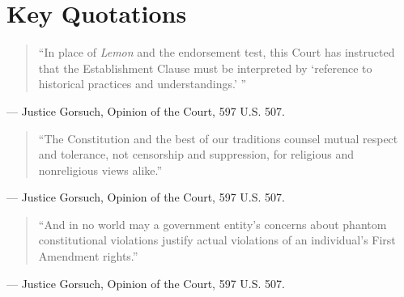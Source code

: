 \documentclass[12pt]{article}
\begin{document}
\section{Key Quotations}

\begin{quote}
``In place of \textit{Lemon} and the endorsement test, this Court has instructed that the Establishment Clause must be interpreted by `reference to historical practices and understandings.' ''
\end{quote}
\noindent --- Justice Gorsuch, Opinion of the Court, 597 U.S. 507.

\begin{quote}
``The Constitution and the best of our traditions counsel mutual respect and tolerance, not censorship and suppression, for religious and nonreligious views alike.''
\end{quote}
\noindent --- Justice Gorsuch, Opinion of the Court, 597 U.S. 507.

\begin{quote}
``And in no world may a government entity's concerns about phantom constitutional violations justify actual violations of an individual's First Amendment rights.''
\end{quote}
\noindent --- Justice Gorsuch, Opinion of the Court, 597 U.S. 507.
\end{document}
